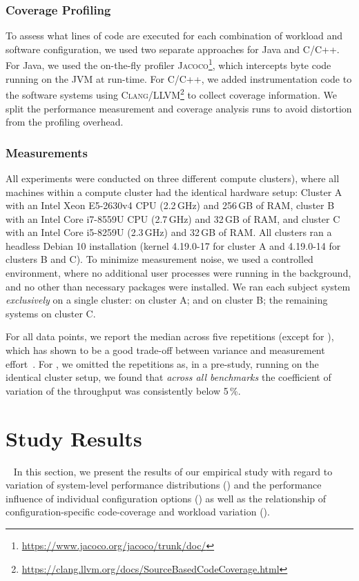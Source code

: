 {\subsubsection{Coverage Profiling}\label{sec:profiling}
To assess what lines of code are executed for each combination of workload and software configuration, we used two separate approaches for Java and C/C++. For Java, we used the on-the-fly profiler \textsc{Jacoco}\footnote{\url{https://www.jacoco.org/jacoco/trunk/doc/}}, which intercepts byte code running on the JVM at run-time. For C/C++, we added instrumentation code to the software systems using \textsc{Clang/LLVM}\footnote{\url{https://clang.llvm.org/docs/SourceBasedCodeCoverage.html}} to collect coverage information. We split the performance measurement and coverage analysis runs to  avoid distortion from the profiling overhead.
	
\subsubsection{Measurements}\label{sec:measurement_setup}
All experiments were conducted on three different compute clusters), where all machines within a compute cluster had the identical hardware setup: Cluster A with an Intel Xeon E5-2630v4 CPU (2.2\,GHz) and 256\,GB of RAM, cluster B  with an Intel Core i7-8559U CPU (2.7\,GHz) and 32\,GB of RAM, and cluster \textsf{C} with an Intel Core i5-8259U (2.3\,GHz) and 32\,GB of RAM. All clusters ran a headless Debian 10 installation (kernel 4.19.0-17 for cluster A and 4.19.0-14 for clusters B and C). To minimize measurement noise, we used a controlled environment, where no additional user processes were running in the background, and no other than necessary packages were installed. 
We ran each subject system \textit{exclusively} on a single cluster: \htwo on cluster A; \dconvert and \batik on cluster B; the remaining systems on cluster C.

For all data points, we report the median across five repetitions (except for \htwo), which has shown to be a good trade-off between variance and measurement effort~\cite{molyneauxArtApplicationPerformance2015}. For \htwo, we omitted the repetitions as, in a pre-study, running on the identical cluster setup, we found that \textit{across all benchmarks} the coefficient of variation of the throughput was consistently below 5\,\%.

\section{Study Results}~\label{sec:results}
In this section, we present the results of our empirical study with regard to variation of system-level performance distributions () and the performance influence of individual configuration options () as well as the relationship of configuration-specific code-coverage and workload variation (). 

}
